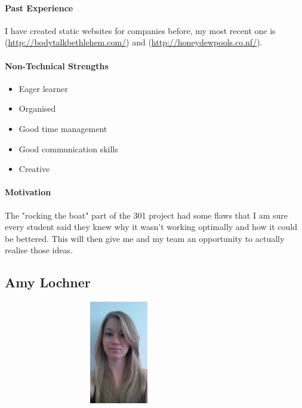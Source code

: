 \documentclass[english]{article}
\begin{document}
			\paragraph{Past Experience}
            I have created static websites for companies before, my most recent one is (\href{http://bodytalkbethlehem.com/}{http://bodytalkbethlehem.com/}) and (\href{http://honeydewpools.co.nf/}{http://honeydewpools.co.nf/}).
			
			\paragraph{Non-Technical Strengths}
			\begin{itemize}
				\setlength\itemsep{0.2em}
			        \item Eager learner
			        \item Organised 
			        \item Good time management
			        \item Good communication skills
			        \item Creative
			\end{itemize}
			
			\paragraph{Motivation}
			The "rocking the boat" part of the 301 project had some flaws that I am sure every student said they knew why it wasn’t working optimally and how it could be bettered. This will then give me and my team an opportunity to actually realise those ideas.
		
		\newpage
		\subsection{Amy Lochner}
		    \begin{figure}
				\begin{center}
					\includegraphics[width=8cm, height=4.5cm, angle=90]{amy.jpg}
				\end{center}
			\end{figure}
\end{document}
